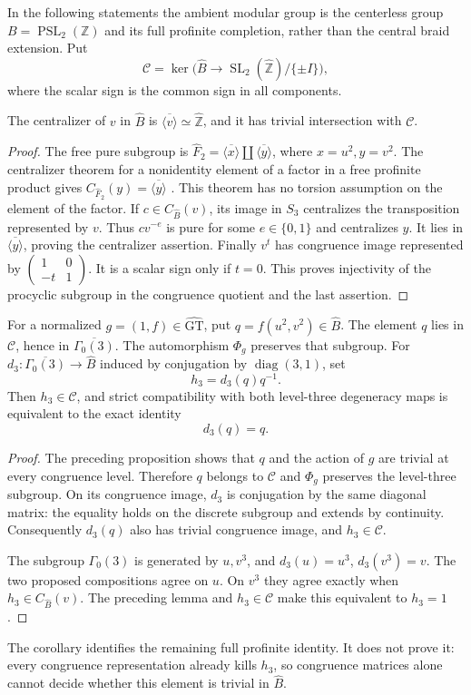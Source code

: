 In the following statements the ambient modular group is the
centerless group $B=\operatorname{PSL}_2(\mathbb Z)$ and its full
profinite completion, rather than the central braid extension. Put
\[
 \mathcal C=\ker\bigl(\widehat B\longrightarrow
      \operatorname{SL}_2(\widehat{\mathbb Z})/\{\pm I\}\bigr),
\]
where the scalar sign is the common sign in all components.

\begin{lemma}\label{lem:parabolic-centralizer}
The centralizer of $v$ in $\widehat B$ is
$\overline{\langle v\rangle}\simeq\widehat{\mathbb Z}$, and
it has trivial intersection with $\mathcal C$.
\end{lemma}
\begin{proof}
The free pure subgroup is
$\widehat F_2=\overline{\langle x\rangle}\amalg
\overline{\langle y\rangle}$, where $x=u^2,y=v^2$.
The centralizer theorem for a nonidentity element of a factor in a
free profinite product gives
$C_{\widehat F_2}(y)=\overline{\langle y\rangle}$
\cite[Theorem B, p.~155; Theorem B$'$, \S4, p.~159]{HerfortRibes1985}.
This theorem has no torsion assumption on the element of the factor.
If $c\in C_{\widehat B}(v)$, its image in $S_3$ centralizes the
transposition represented by $v$. Thus $cv^{-e}$ is pure for
some $e\in\{0,1\}$ and centralizes $y$. It lies in
$\overline{\langle y\rangle}$, proving the centralizer assertion.
Finally $v^t$ has congruence image represented by
$\left(\begin{smallmatrix}1&0\\-t&1\end{smallmatrix}\right)$.
It is a scalar sign only if $t=0$. This proves injectivity of the
procyclic subgroup in the congruence quotient and the last assertion.
\end{proof}

\begin{corollary}\label{cor:level-three-exact-gate}
For a normalized $g=(1,f)\in\widehat{\mathrm{GT}}$, put
$q=f(u^2,v^2)\in\widehat B$. The element $q$ lies in
$\mathcal C$, hence in $\overline{\Gamma_0(3)}$.
The automorphism $\Phi_g$ preserves that subgroup. For
$d_3:\overline{\Gamma_0(3)}\to\widehat B$ induced by
conjugation by $\operatorname{diag}(3,1)$, set
\[
 h_3=d_3(q)q^{-1}.
\]
Then $h_3\in\mathcal C$, and strict compatibility with both
level-three degeneracy maps is equivalent to the exact identity
\[
 d_3(q)=q.
\]
\end{corollary}
\begin{proof}
The preceding proposition shows that $q$ and the action of $g$
are trivial at every congruence level. Therefore $q$ belongs to
$\mathcal C$ and $\Phi_g$ preserves the level-three subgroup.
On its congruence image, $d_3$ is conjugation by the same diagonal
matrix: the equality holds on the discrete subgroup and extends
by continuity. Consequently $d_3(q)$ also has trivial congruence
image, and $h_3\in\mathcal C$.

The subgroup $\Gamma_0(3)$ is generated by $u,v^3$, and
$d_3(u)=u^3$, $d_3(v^3)=v$. The two proposed compositions agree
on $u$. On $v^3$ they agree exactly when
$h_3\in C_{\widehat B}(v)$. The preceding lemma and
$h_3\in\mathcal C$ make this equivalent to $h_3=1$.
\end{proof}

The corollary identifies the remaining full profinite identity. It does
not prove it: every congruence representation already kills $h_3$, so
congruence matrices alone cannot decide whether this element is trivial
in $\widehat B$.
